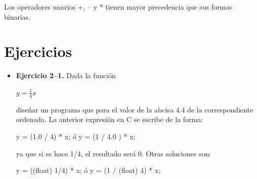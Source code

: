 Los operadores unarios +, -- y * tienen mayor precedencia que sus formas 
binarias.

\section{Ejercicios}

\begin{itemize}

\item \textbf{Ejercicio 2--1.} Dada la funci\'on

$y = \frac{1}{4} x$

dise\~nar un programa que para el valor de la abcisa 4.4 de la 
correspondiente ordenada. La anterior expresi\'on en C se 
escribe de la forma:

y = (1.0 / 4) * x;
\'o
y = (1 / 4.0 ) * x;

ya que si se hace 1/4, el resultado ser\'a 0. Otras soluciones
son:

y = ((float) 1/4) * x;
\'o
y = (1 / (float) 4) * x;

\end{itemize}
